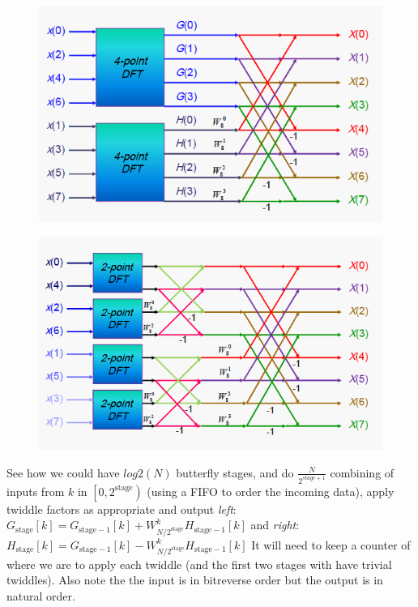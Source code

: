 \documentclass{article}
\begin{document}
\begin{figure}[h!]
  \begin{minipage}{0.5\textwidth}
    \centering
    \includegraphics[width=\linewidth]{dit_1.png}
      \label{fig:dit1}
  \end{minipage}
  \begin{minipage}{0.5\textwidth}
    \centering
    \includegraphics[width=\linewidth]{dit_2.png}
      \label{fig:dit2}
 \end{minipage}
\end {figure}

See how we could have $log2\left(N\right)$ butterfly stages, and do $\frac{N}{2^{stage+1}}$ combining of inputs from $k$ in $\left[0, 2^{\text{stage}}\right)$
(using a FIFO to order the incoming data), apply twiddle factors as appropriate and output
\emph{left}: $G_{\text{stage}}\left[k\right]=G_{\text{stage}-1}\left[k\right]+W_{N/2^{\text{stage}}}^{k} H_{\text{stage}-1}\left[k\right]$
and \emph{right}: $H_{\text{stage}}\left[k\right]=G_{\text{stage}-1}\left[k\right]-W_{N/2^{\text{stage}}}^{k} H_{\text{stage}-1}\left[k\right]$
It will need to keep a counter of where we are to apply each twiddle (and the first two stages with have trivial twiddles).
Also note the the input is in bitreverse order but the output is in natural order.
\end{document}
